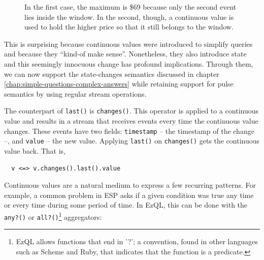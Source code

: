 \begin{figure}[t]
  \centering
  \caption{In the first case, the maximum is \$69 because only the
    second event lies inside the window. In the second, though, a
    continuous value is used to hold the higher price so that it still
    belongs to the window.}
  \label{fig:acme}
\end{figure}



This is surprising because continuous values were introduced to
simplify queries and because they ``kind-of make sense''. Nonetheless,
they also introduce state and this seemingly innocuous change has
profound implications. Through them, we can now support the
state-changes semantics discussed in chapter
\ref{chap:simple-questions-complex-answers} while retaining support
for pulse semantics by using regular stream operations.

The counterpart of \verb=last()= is \verb=changes()=. This operator is
applied to a continuous value and results in a stream that receives
events every time the continuous value changes. These events have two
fields: \verb=timestamp= -- the timestamp of the change --, and
\verb=value= -- the new value. Applying \verb=last()= on
\verb=changes()= gets the continuous value back. That is,

\begin{lstlisting}
  v <=> v.changes().last().value
\end{lstlisting}

Continuous values are a natural medium to express a few recurring
patterns. For example, a common problem in ESP asks if a given
condition was true any time or every time during some period of
time. In EzQL, this can be done with the \verb=any?()= or
\verb=all?()=\footnote{EzQL allows functions that end in '?'; a
  convention, found in other languages such as Scheme and Ruby, that
  indicates that the function is a predicate.}  aggregators:

